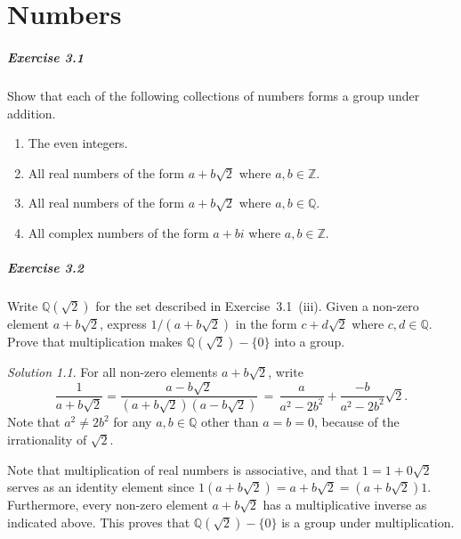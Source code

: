 \documentclass[11pt]{report}
\def\Q{\mathbb{Q}}
\def\Z{\mathbb{Z}}
\theoremstyle{remark}
\newtheorem*{solution}{Solution}
\begin{document}
    \chapter{Numbers}

    \paragraph{Exercise 3.1} Show that each of the following collections of numbers
    forms a group under addition.
    \begin{enumerate}
        \itemsep0em
        \item The even integers.
        \item All real numbers of the form $a + b\sqrt{2}$ where $a, b \in \Z$.
        \item All real numbers of the form $a + b\sqrt{2}$ where $a, b \in \Q$.
        \item All complex numbers of the form $a + bi$ where $a, b \in \Z$.
    \end{enumerate}

    \paragraph{Exercise 3.2} Write $\Q(\sqrt{2})$ for the set described in
    Exercise~3.1~(iii). Given a non-zero element $a + b\sqrt{2}$, express $1 / (a +
    b\sqrt{2})$ in the form $c + d\sqrt{2}$ where $c, d \in \Q$. Prove that
    multiplication makes $\Q(\sqrt{2}) - \{0\}$ into a group.
    \begin{solution}
        For all non-zero elements $a + b\sqrt{2}$, write \[
            \frac{1}{a + b\sqrt{2}} = \frac{a - b\sqrt{2}}{(a + b\sqrt{2})(a -
            b\sqrt{2})} \,=\, \frac{a}{a^2 - 2b^2} + \frac{-b}{a^2 - 2b^2}\sqrt{2}.
        \] Note that $a^2 \neq 2b^2$ for any $a, b \in \Q$ other than $a = b = 0$,
        because of the irrationality of $\sqrt{2}$.

        Note that multiplication of real numbers is associative, and that $1 = 1 +
        0\sqrt{2}$ serves as an identity element since $1(a + b\sqrt{2}) = a +
        b\sqrt{2} = (a + b\sqrt{2})1$. Furthermore, every non-zero element $a + b\sqrt{2}$
        has a multiplicative inverse as indicated above. This proves that
        $\Q(\sqrt{2}) - \{0\}$ is a group under multiplication.
    \end{solution}
    
\end{document}
